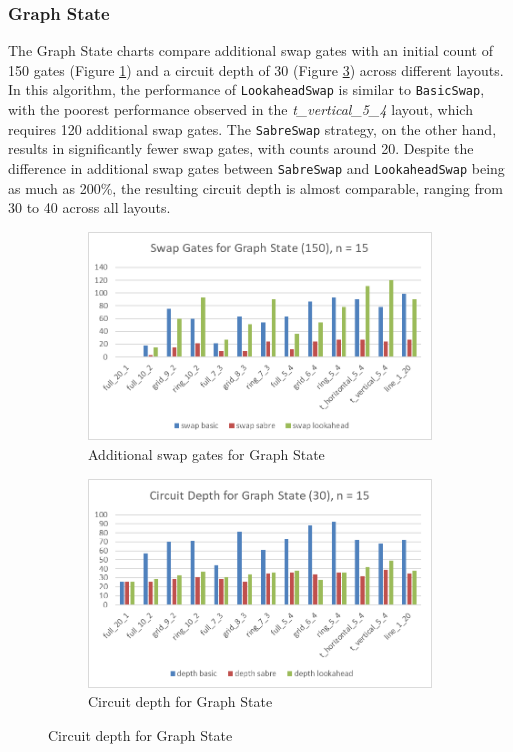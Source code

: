 \subsubsection{Graph State} %
The Graph State charts compare additional swap gates with an initial count of 150 gates (Figure \ref{fig:chart-graphstate}) and a circuit depth of 30 (Figure \ref{fig:chart-graphstate-depth}) across different layouts. In this algorithm, the performance of \lstinline{LookaheadSwap} is similar to \lstinline{BasicSwap}, with the poorest performance observed in the \textit{t\_vertical\_5\_4} layout, which requires 120 additional swap gates. The \lstinline{SabreSwap} strategy, on the other hand, results in significantly fewer swap gates, with counts around 20. Despite the difference in additional swap gates between \lstinline{SabreSwap} and \lstinline{LookaheadSwap} being as much as 200\%, the resulting circuit depth is almost comparable, ranging from 30 to 40 across all layouts.
\begin{figure}[htb]
    \centering
    \begin{subfigure}{0.48\linewidth}
        \includegraphics[width=\linewidth]{image/chart_graphstate.png}
        \caption{Additional swap gates for Graph State}
        \label{fig:chart-graphstate}
    \end{subfigure}
    \begin{subfigure}{0.48\linewidth}
        \includegraphics[width=\linewidth]{image/chart_graphstate_depth.png}
        \caption{Circuit depth for Graph State}
        \label{fig:chart-graphstate-depth}
    \end{subfigure}
\end{figure}

